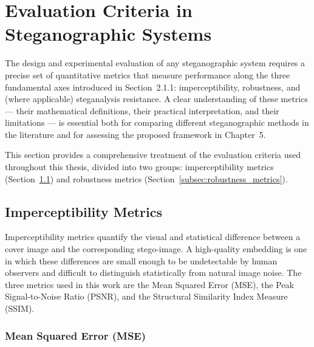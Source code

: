 \documentclass[12pt,a4paper,oneside]{report}
\begin{document}
	
	\section{Evaluation Criteria in Steganographic Systems}
	\label{sec:evaluation_metrics}
	
	The design and experimental evaluation of any steganographic system requires a precise set of
	quantitative metrics that measure performance along the three fundamental axes introduced in
	Section~2.1.1: imperceptibility, robustness, and (where applicable) steganalysis resistance. A
	clear understanding of these metrics — their mathematical definitions, their practical
	interpretation, and their limitations — is essential both for comparing different steganographic
	methods in the literature and for assessing the proposed framework in Chapter~5.
	
	This section provides a comprehensive treatment of the evaluation criteria used throughout this
	thesis, divided into two groups: imperceptibility metrics (Section~\ref{subsec:imperceptibility})
	and robustness metrics (Section~\ref{subsec:robustness_metrics}).
	
	\subsection{Imperceptibility Metrics}
	\label{subsec:imperceptibility}
	
	Imperceptibility metrics quantify the visual and statistical difference between a cover image
	and the corresponding stego-image. A high-quality embedding is one in which these differences
	are small enough to be undetectable by human observers and difficult to distinguish
	statistically from natural image noise. The three metrics used in this work are the Mean Squared
	Error (MSE), the Peak Signal-to-Noise Ratio (PSNR), and the Structural Similarity Index Measure
	(SSIM).
	
	\subsubsection{Mean Squared Error (MSE)}
	
\end{document}
